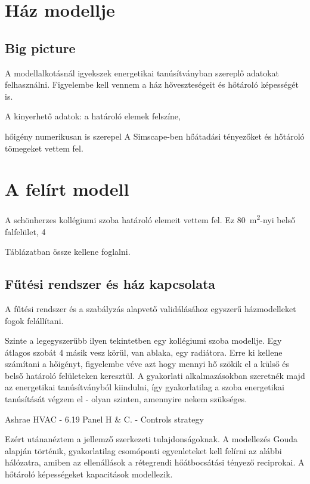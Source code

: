 \section{Ház modellje}

\subsection{Big picture}

A modellalkotásnál igyekszek energetikai tanúsítványban szereplő adatokat felhasználni.
Figyelembe kell vennem a ház hőveszteségeit és hőtároló képességét is.

A kinyerhető adatok: a határoló elemek felszíne,

hőigény numerikusan is szerepel
A Simscape-ben hőátadási tényezőket és hőtároló tömegeket vettem fel.


\section{A felírt modell}

A schönherzes kollégiumi szoba határoló elemeit vettem fel. Ez \SI{80}{\meter\squared}-nyi belső falfelület, 4

Táblázatban össze kellene foglalni.




\subsection{Fűtési rendszer és ház kapcsolata}





A fűtési rendszer és a szabályzás alapvető validálásához egyszerű házmodelleket fogok felállítani.

Szinte a legegyszerűbb ilyen tekintetben egy kollégiumi szoba modellje. Egy átlagos szobát 4 másik vesz körül, van ablaka, egy radiátora.
Erre ki kellene számítani a hőigényt, figyelembe véve azt hogy mennyi hő szökik el a külső és belső határoló felületeken keresztül.
A gyakorlati alkalmazásokban szeretnék majd az energetikai tanúsítványból kiindulni, így gyakorlatilag a szoba energetikai tanúsítását végzem el - olyan szinten, amennyire nekem szükséges.


Ashrae HVAC - 6.19 Panel H \& C. - Controls strategy

Ezért utánanéztem a jellemző szerkezeti tulajdonságoknak. A modellezés Gouda alapján történik, gyakorlatilag csomóponti egyenleteket kell felírni az alábbi hálózatra, amiben az ellenállások a rétegrendi hőátbocsátási tényező reciprokai. A hőtároló képességeket kapacitások modellezik.


